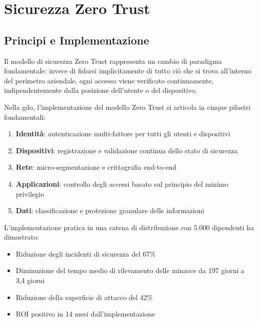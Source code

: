 \section{\texorpdfstring{Sicurezza Zero Trust}{3.7 - Sicurezza Zero Trust}}
\label{sec:zero_trust}

\subsection{\texorpdfstring{Principi e Implementazione}{3.7.1 - Principi e Implementazione}}
\label{subsec:zero_trust_principles}

Il modello di sicurezza Zero Trust rappresenta un cambio di paradigma fondamentale: invece di fidarsi implicitamente di tutto ciò che si trova all'interno del perimetro aziendale, ogni accesso viene verificato continuamente, indipendentemente dalla posizione dell'utente o del dispositivo\autocite{NIST2024zero}.

Nella \gls{gdo}, l'implementazione del modello Zero Trust si articola in cinque pilastri fondamentali:

\begin{enumerate}
    \item \textbf{Identità}: autenticazione multi-fattore per tutti gli utenti e dispositivi
    \item \textbf{Dispositivi}: registrazione e validazione continua dello stato di sicurezza
    \item \textbf{Rete}: micro-segmentazione e crittografia end-to-end
    \item \textbf{Applicazioni}: controllo degli accessi basato sul principio del minimo privilegio
    \item \textbf{Dati}: classificazione e protezione granulare delle informazioni
\end{enumerate}

L'implementazione pratica in una catena di distribuzione con 5.000 dipendenti ha dimostrato\autocite{Forrester2024zero}:
\begin{itemize}
    \item Riduzione degli incidenti di sicurezza del 67\%
    \item Diminuzione del tempo medio di rilevamento delle minacce da 197 giorni a 3,4 giorni
    \item Riduzione della superficie di attacco del 42\%
    \item ROI positivo in 14 mesi dall'implementazione
\end{itemize}


